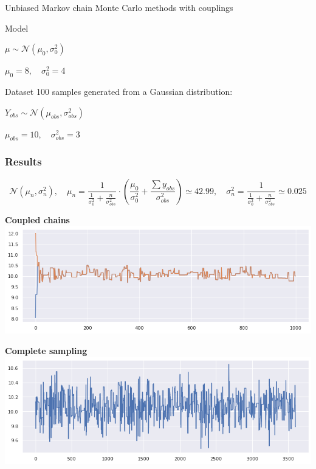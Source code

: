 \documentclass{beamer}
\begin{document}
\begin{section}{Unbiased Markov chain Monte Carlo methods with couplings}
\begin{frame}
\begin{block}{Model}
\begin{center}
				$ \mu  \sim \mathcal{N}(\mu_0, \sigma_0^2)$
				
				$\mu_0 = 8, \quad \sigma^2_0 = 4$
			\end{center}
		\end{block}
		
		\begin{block}{Dataset}
			100 samples generated from a Gaussian distribution:
			\begin{center}
				$
				Y_{obs} \sim \mathcal{N}(\mu_{obs}, \sigma_{obs} ^2)
				$
				
				$
				\mu_{obs} = 10, \quad
				\sigma_{obs} ^2 = 3
				$
			\end{center}
		\end{block}
	\end{frame}

	\begin{frame}
		\frametitle{Results}
		
		{\small
			$$
				\mathcal{N}(\mu_n, \sigma^2_n), 
				\quad
				\mu_n 
					= \frac{1}{ \frac{1}{\sigma_0^2} + \frac{n}{\sigma_{obs}^2} } 
					\cdot \left(\frac{\mu_0}{\sigma_0^2} + \frac{\sum y_{obs}}{\sigma_{obs}^2}\right)
					\simeq 42.99,
				\quad
				\sigma^2_n
					= \frac{1}{ \frac{1}{\sigma_0^2} + \frac{n}{\sigma_{obs}^2} } 
					\simeq 0.025
		$$
		}
	
		\begin{minipage}{0.48\textwidth}
			\begin{center}
				{\scriptsize \textbf{Coupled chains} }
				\includegraphics[width=\textwidth]{immagini_coupling/2_catene_coupling}
			\end{center}
		\end{minipage}
		\hfill
		\begin{minipage}{0.48\textwidth}
			\begin{center}
				{\scriptsize \textbf{Complete sampling}}
				\includegraphics[width=\textwidth]{immagini_coupling/traceplot_coupling}
			\end{center}
		\end{minipage}
	

\end{frame}
\end{section}
\end{document}
